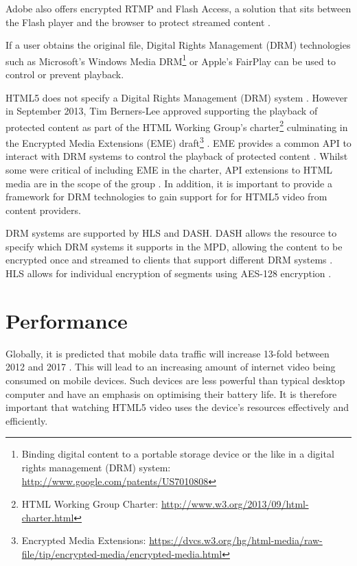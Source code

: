 \documentclass[journal]{IEEEtran}
\begin{document}
Adobe also offers encrypted RTMP and Flash Access, a solution that sits between the Flash player and the browser to protect streamed content \cite{whitePaper:flashAccess}.

If a user obtains the original file, Digital Rights Management (DRM) technologies such as Microsoft's Windows Media DRM\footnote{Binding digital content to a portable storage device or the like in a digital rights management (DRM) system: \url{http://www.google.com/patents/US7010808}} or Apple's FairPlay can be used to control or prevent playback.

HTML5 does not specify a Digital Rights Management (DRM) system \cite{article:HTML5LeadsAWebRevolution}. However in September 2013, Tim Berners-Lee approved supporting the playback of protected content as part of the HTML Working Group's charter\footnote{HTML Working Group Charter: \url{http://www.w3.org/2013/09/html-charter.html}} culminating in the Encrypted Media Extensions (EME) draft\footnote{Encrypted Media Extensions: \url{https://dvcs.w3.org/hg/html-media/raw-file/tip/encrypted-media/encrypted-media.html}} \cite{email:newHTMLCharter}. EME provides a common API to interact with DRM systems to control the playback of protected content \cite{standard:eme}. Whilst some were critical of including EME in the charter, API extensions to HTML media are in the scope of the group \cite{website:EEFDRM}\cite{email:emeInScope}. In addition, it is important to provide a framework for DRM technologies to gain support for for HTML5 video from content providers.

DRM systems are supported by HLS and DASH. DASH allows the resource to specify which DRM systems it supports in the MPD, allowing the content to be encrypted once and streamed to clients that support different DRM systems \cite{article:MPEGDASH}. HLS allows for individual encryption of segments using AES-128 encryption \cite{techreport:aReviewOfHTTPLiveStreaming}.

\section{Performance}
Globally, it is predicted that mobile data traffic will increase 13-fold between 2012 and 2017 \cite{website:ciscoForecastAndMethodology}. This will lead to an increasing amount of internet video being consumed on mobile devices. Such devices are less powerful than typical desktop computer and  have an emphasis on optimising their battery life. It is therefore important that watching HTML5 video uses the device's resources effectively and efficiently. %
\end{document}
